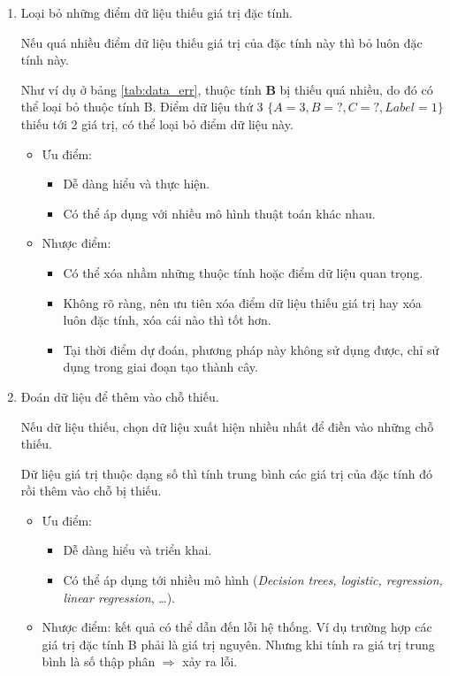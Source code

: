 \documentclass[../main-report.tex]{subfiles}
\begin{document}
\begin{enumerate}
\item Loại bỏ những điểm dữ liệu thiếu giá trị đặc tính.

Nếu quá nhiều điểm dữ liệu thiếu giá trị của đặc tính này thì bỏ luôn đặc tính này.

Như ví dụ ở bảng \ref{tab:data_err}, thuộc tính \textbf{B} bị thiếu quá nhiều, do đó có thể loại bỏ thuộc tính B. Điểm dữ liệu thứ 3 $\{A=3, B=?, C=?, Label=1 \}$ thiếu tới 2 giá trị, có thể loại bỏ điểm dữ liệu này.

\begin{itemize}
\item Ưu điểm:
\begin{itemize}
\item Dễ dàng hiểu và thực hiện.
\item Có thể áp dụng với nhiều mô hình thuật toán khác nhau.
\end{itemize}
\item Nhược điểm:
\begin{itemize}
\item Có thể xóa nhầm những thuộc tính hoặc điểm dữ liệu quan trọng.
\item Không rõ ràng, nên ưu tiên xóa điểm dữ liệu thiếu giá trị hay xóa luôn đặc tính, xóa cái nào thì tốt hơn.
\item Tại thời điểm dự đoán, phương pháp này không sử dụng được, chỉ sử dụng trong giai đoạn tạo thành cây.
\end{itemize}
\end{itemize}

\item Đoán dữ liệu để thêm vào chỗ thiếu.

Nếu dữ liệu thiếu, chọn dữ liệu xuất hiện nhiều nhất để điền vào những chỗ thiếu.

Dữ liệu giá trị thuộc dạng số thì tính trung bình các giá trị của đặc tính đó rồi thêm vào chỗ bị thiếu.

\begin{itemize}
\item Ưu điểm:
\begin{itemize}
\item Dễ dàng hiểu và triển khai.
\item Có thể áp dụng tới nhiều mô hình (\emph{Decision trees, logistic, regression, linear regression}, \ldots).
\end{itemize}
\item Nhược điểm: kết quả có thể dẫn đến lỗi hệ thống. Ví dụ trường hợp các giá trị đặc tính B phải là giá trị nguyên. Nhưng khi tính ra giá trị trung bình là số thập phân $\Rightarrow$ xảy ra lỗi.
\end{itemize}


\end{enumerate}
\end{document}

